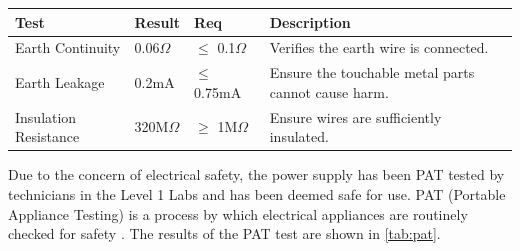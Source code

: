 \begin{minipage}{\textwidth}
    \begin{minipage}{0.6\textwidth}
        \centering
        {\fontsize{10pt}{12pt}\selectfont
        \begin{tabularx}{\textwidth}{|X|p{1cm}|p{1cm}|X|}
            \hline
            \textbf{Test} & \textbf{Result} & \textbf{Req} & \textbf{Description} \\ \hline
            Earth Continuity & 0.06$\Omega$ & $\leq$ 0.1$\Omega$ & Verifies the earth wire is connected. \\ \hline
            Earth Leakage & 0.2mA & $\leq$ 0.75mA & Ensure the touchable metal parts cannot cause harm. \\ \hline
            Insulation Resistance & 320M$\Omega$ & $\geq$ 1M$\Omega$ & Ensure wires are sufficiently insulated. \\ \hline
        \end{tabularx}
        }
    \end{minipage}%
    \hfill %
    \begin{minipage}{0.45\textwidth}
        \centering
    \end{minipage}
    \label{tab:pat}
\end{minipage}


Due to the concern of electrical safety,  the power supply has been PAT tested by technicians in the Level 1 Labs and has been deemed safe for use. PAT (Portable Appliance Testing) is a process by which electrical appliances are routinely checked for safety \cite{patwiki, patspec}. The results of the PAT test are shown in \autoref{tab:pat}.

